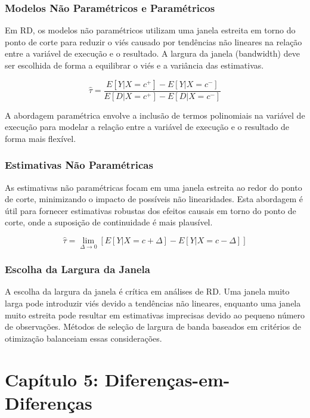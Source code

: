 \documentclass[a4paper,12pt]{article}[abntex2]
\begin{document}
\subsubsection*{Modelos Não Paramétricos e Paramétricos}

Em RD, os modelos não paramétricos utilizam uma janela estreita em torno do ponto de corte para reduzir o viés causado por tendências não lineares na relação entre a variável de execução e o resultado. A largura da janela (bandwidth) deve ser escolhida de forma a equilibrar o viés e a variância das estimativas.

\begin{equation}
    \hat{\tau} = \frac{E[Y|X=c^+] - E[Y|X=c^-]}{E[D|X=c^+] - E[D|X=c^-]}
\end{equation}

A abordagem paramétrica envolve a inclusão de termos polinomiais na variável de execução para modelar a relação entre a variável de execução e o resultado de forma mais flexível.

\subsubsection*{Estimativas Não Paramétricas}

As estimativas não paramétricas focam em uma janela estreita ao redor do ponto de corte, minimizando o impacto de possíveis não linearidades. Esta abordagem é útil para fornecer estimativas robustas dos efeitos causais em torno do ponto de corte, onde a suposição de continuidade é mais plausível.

\begin{equation}
    \hat{\tau} = \lim_{\Delta \to 0} \left[ E[Y | X = c + \Delta] - E[Y | X = c - \Delta] \right]
\end{equation}

\subsubsection*{Escolha da Largura da Janela}

A escolha da largura da janela é crítica em análises de RD. Uma janela muito larga pode introduzir viés devido a tendências não lineares, enquanto uma janela muito estreita pode resultar em estimativas imprecisas devido ao pequeno número de observações. Métodos de seleção de largura de banda baseados em critérios de otimização balanceiam essas considerações.

\newpage
\section{Capítulo 5: Diferenças-em-Diferenças}
\end{document}
